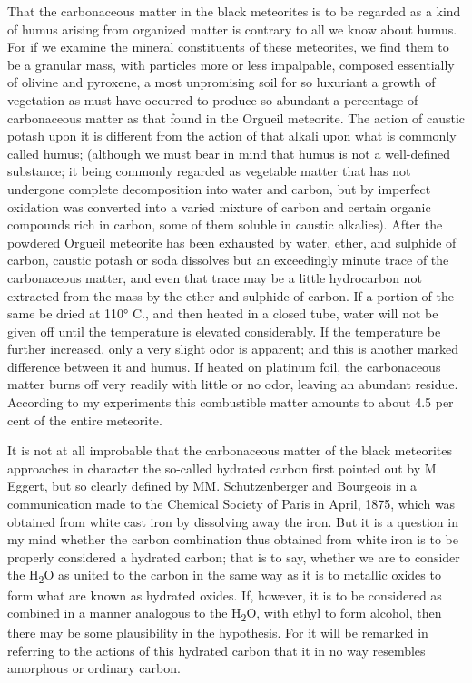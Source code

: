\documentclass[a4paper, 11pt, oneside, english]{article}
\begin{document}
That the carbonaceous matter in the black meteorites is to be regarded as a kind of humus arising from organized matter is contrary to all we know about humus. For if we examine the mineral constituents of these meteorites, we find them to be a granular mass, with particles more or less impalpable, composed essentially of olivine and pyroxene, a most unpromising soil for so luxuriant a growth of vegetation as must have occurred to produce so abundant a percentage of carbonaceous matter as that found in the Orgueil meteorite. The action of caustic potash upon it is different from the action of that alkali upon what is commonly called humus; (although we must bear in mind that humus is not a well-defined substance; it being commonly regarded as vegetable matter that has not undergone complete decomposition into water and carbon, but by imperfect oxidation was converted into a varied mixture of carbon and certain organic compounds rich in carbon, some of them soluble in caustic alkalies). After the powdered Orgueil meteorite has been exhausted by water, ether, and sulphide of carbon, caustic potash or soda dissolves but an exceedingly minute trace of the carbonaceous matter, and even that trace may be a little hydrocarbon not extracted from the mass by the ether and sulphide of carbon. If a portion of the same be dried at 110° C., and then heated in a closed tube, water will not be given off until the temperature is elevated considerably. If the temperature be further increased, only a very slight odor is apparent; and this is another marked difference between it and humus. If heated on platinum foil, the carbonaceous matter burns off very readily with little or no odor, leaving an abundant residue. According to my experiments this combustible matter amounts to about 4.5 per cent of the entire meteorite.

It is not at all improbable that the carbonaceous matter of the black meteorites approaches in character the so-called hydrated carbon first pointed out by M. Eggert, but so clearly defined by MM. Schutzenberger and Bourgeois in a communication made to the Chemical Society of Paris in April, 1875, which was obtained from white cast iron by dissolving away the iron. But it is a question in my mind whether the carbon combination thus obtained from white iron is to be properly considered a hydrated carbon; that is to say, whether we are to consider the H\textsubscript{2}O as united to the carbon in the same way as it is to metallic oxides to form what are known as hydrated oxides. If, however, it is to be considered as combined in a manner analogous to the H\textsubscript{2}O, with ethyl to form alcohol, then there may be some plausibility in the hypothesis. For it will be remarked in referring to the actions of this hydrated carbon that it in no way resembles amorphous or ordinary carbon.
\end{document}
